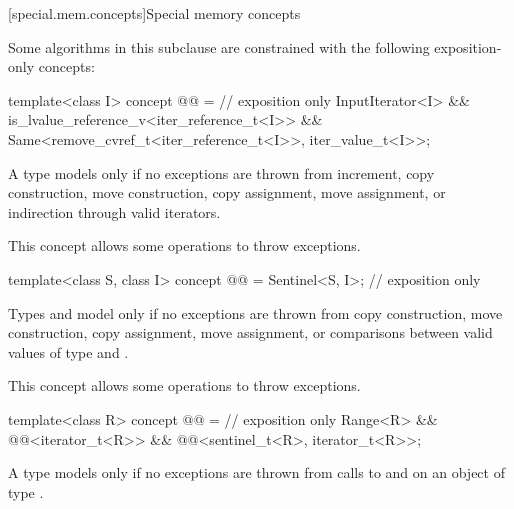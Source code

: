 [special.mem.concepts]{Special memory concepts}

\pnum
Some algorithms in this subclause are constrained with the following
exposition-only concepts:

\begin{itemdecl}
template<class I>
concept @@ = // exposition only
  InputIterator<I> &&
  is_lvalue_reference_v<iter_reference_t<I>> &&
  Same<remove_cvref_t<iter_reference_t<I>>, iter_value_t<I>>;
\end{itemdecl}

\begin{itemdescr}
\pnum
A type  models  only if
no exceptions are thrown from increment,
copy construction, move construction,
copy assignment, move assignment,
or indirection through valid iterators.

\pnum
\begin{note}
This concept allows some 
operations to throw exceptions.
\end{note}
\end{itemdescr}

\begin{itemdecl}
template<class S, class I>
concept @@ = Sentinel<S, I>; // exposition only
\end{itemdecl}

\begin{itemdescr}
\pnum
Types  and  model 
only if no exceptions are thrown from copy construction, move construction,
copy assignment, move assignment, or comparisons between
valid values of type  and .

\pnum
\begin{note}
This concept allows some 
operations to throw exceptions.
\end{note}
\end{itemdescr}

\begin{itemdecl}
template<class R>
concept @@ = // exposition only
  Range<R> &&
  @@<iterator_t<R>> &&
  @@<sentinel_t<R>, iterator_t<R>>;
\end{itemdecl}

\begin{itemdescr}
\pnum
A type  models  only if
no exceptions are thrown from calls to  and
 on an object of type .
\end{itemdescr}

